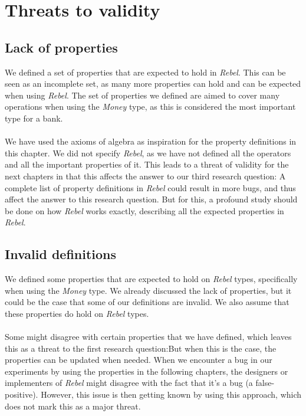 \section{Threats to validity}
\subsection*{Lack of properties}
We defined a set of properties that are expected to hold in \textit{Rebel}.
This can be seen as an incomplete set, as many more properties can hold and can
be expected when using \textit{Rebel}. The set of properties we defined are
aimed to cover many operations when using the \textit{Money} type, as this is
considered the most important type for a bank.\\
\\
We have used the axioms of algebra as inspiration for the property definitions
in this chapter. We did not specify \textit{Rebel}, as we have not defined all
the operators and all the important properties of it. This leads to a threat of
validity for the next chapters in that this affects the answer to our third
research question:\rqThree
A complete list of property definitions in
\textit{Rebel} could result in more bugs, and thus affect the answer to this
research question. But for this, a profound study should be done on how
\textit{Rebel} works exactly, describing all the expected properties in
\textit{Rebel}.

\subsection*{Invalid definitions}
We defined some properties that are expected to hold on \textit{Rebel} types,
specifically when using the \textit{Money} type. We already discussed the lack
of properties, but it could be the case that some of our definitions are
invalid. We also assume that these properties do hold on \textit{Rebel}
types.\\
\\
Some might disagree with certain properties that we have defined, which leaves
this as a threat to the first research question:\rqOne But when this is the
case, the properties can be updated when needed. When we encounter a bug in our
experiments by using the properties in the following chapters, the designers or
implementers of \textit{Rebel} might disagree with the fact that it's a bug
(a false-positive). However, this issue is then getting known by using this
approach, which does not mark this as a major threat.

